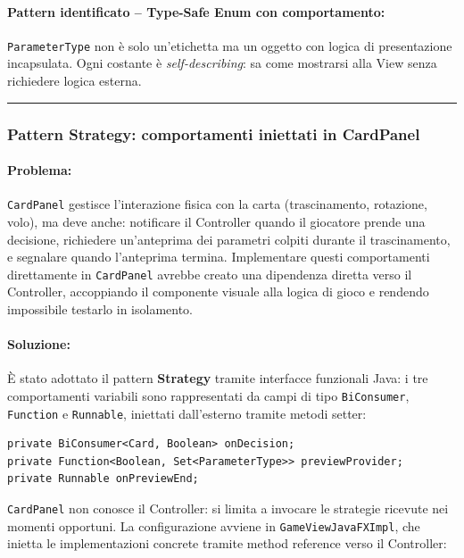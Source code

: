 \documentclass[11pt, a4paper, oneside]{report}
\begin{document}
\paragraph{Pattern identificato -- Type-Safe Enum con comportamento:}
\texttt{ParameterType} non è solo un'etichetta ma un oggetto con
logica di presentazione incapsulata. Ogni costante è \emph{self-describing}:
sa come mostrarsi alla View senza richiedere logica esterna.

\bigskip\noindent\rule{\linewidth}{0.4pt}\bigskip

\bigskip
\subsubsection{Pattern Strategy: comportamenti iniettati in CardPanel}
\smallskip

\paragraph{Problema:}
\texttt{CardPanel} gestisce l'interazione fisica con la carta
(trascinamento, rotazione, volo), ma deve anche: notificare il
Controller quando il giocatore prende una decisione, richiedere
un'anteprima dei parametri colpiti durante il trascinamento, e
segnalare quando l'anteprima termina. Implementare questi comportamenti
direttamente in \texttt{CardPanel} avrebbe creato una dipendenza diretta
verso il Controller, accoppiando il componente visuale alla logica
di gioco e rendendo impossibile testarlo in isolamento.

\paragraph{Soluzione:}
È stato adottato il pattern \textbf{Strategy} tramite interfacce
funzionali Java: i tre comportamenti variabili sono rappresentati
da campi di tipo \texttt{BiConsumer}, \texttt{Function} e
\texttt{Runnable}, iniettati dall'esterno tramite metodi setter:

\begin{lstlisting}
private BiConsumer<Card, Boolean> onDecision;
private Function<Boolean, Set<ParameterType>> previewProvider;
private Runnable onPreviewEnd;
\end{lstlisting}

\texttt{CardPanel} non conosce il Controller: si limita a invocare
le strategie ricevute nei momenti opportuni. La configurazione
avviene in \texttt{GameViewJavaFXImpl}, che inietta le implementazioni
concrete tramite method reference verso il Controller:
\end{document}

